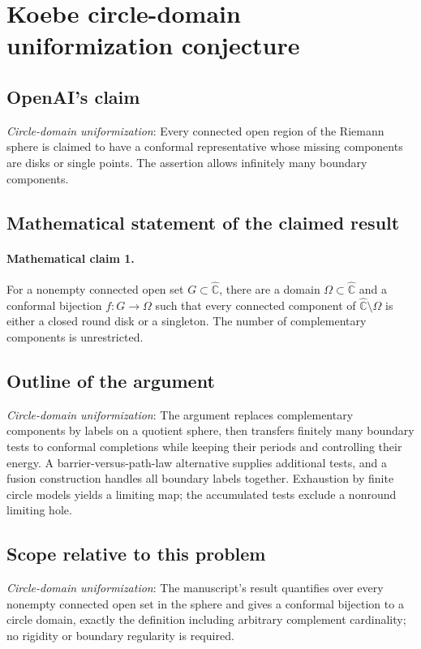 \documentclass[11pt]{article}
\begin{document}
\section*{Koebe circle-domain uniformization conjecture}

\subsection{OpenAI's claim}
\textit{Circle-domain uniformization}: Every connected open region of the Riemann sphere is claimed to have a conformal representative whose missing components are disks or single points. The assertion allows infinitely many boundary components.

\subsection{Mathematical statement of the claimed result}
\paragraph{Mathematical claim 1.} For a nonempty connected open set $G\subset\widehat{\mathbb C}$, there are a domain $\Omega\subset\widehat{\mathbb C}$ and a conformal bijection $f:G\to\Omega$ such that every connected component of $\widehat{\mathbb C}\setminus\Omega$ is either a closed round disk or a singleton. The number of complementary components is unrestricted.

\subsection{Outline of the argument}
\textit{Circle-domain uniformization}: The argument replaces complementary components by labels on a quotient sphere, then transfers finitely many boundary tests to conformal completions while keeping their periods and controlling their energy. A barrier-versus-path-law alternative supplies additional tests, and a fusion construction handles all boundary labels together. Exhaustion by finite circle models yields a limiting map; the accumulated tests exclude a nonround limiting hole.

\subsection{Scope relative to this problem}
\textit{Circle-domain uniformization}: The manuscript’s result quantifies over every nonempty connected open set in the sphere and gives a conformal bijection to a circle domain, exactly the definition including arbitrary complement cardinality; no rigidity or boundary regularity is required.
\end{document}
